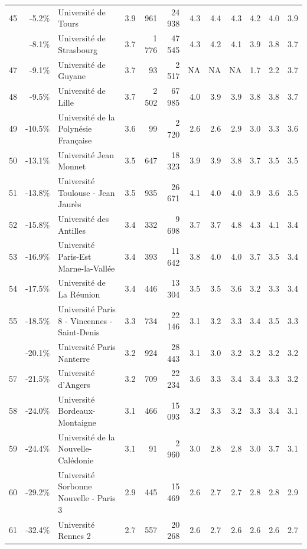 \documentclass[12pt,french,landscape]{article}
\begin{document}
\begin{longtable}{rrlrrrrrrlrr}
\rowcolor{gray!6}  45 & -5.2\% & Université de Tours & 3.9 & 961 & 24 938 & 4.3 & 4.4 & 4.3 & 4.2 & 4.0 & 3.9\\
\addlinespace
46 & -8.1\% & Université de Strasbourg & 3.7 & 1 776 & 47 545 & 4.3 & 4.2 & 4.1 & 3.9 & 3.8 & 3.7\\
\rowcolor{gray!6}  47 & -9.1\% & Université de Guyane & 3.7 & 93 & 2 517 & NA & NA & NA & 1.7 & 2.2 & 3.7\\
48 & -9.5\% & Université de Lille & 3.7 & 2 502 & 67 985 & 4.0 & 3.9 & 3.9 & 3.8 & 3.8 & 3.7\\
\rowcolor{gray!6}  49 & -10.5\% & Université de la Polynésie Française & 3.6 & 99 & 2 720 & 2.6 & 2.6 & 2.9 & 3.0 & 3.3 & 3.6\\
50 & -13.1\% & Université Jean Monnet & 3.5 & 647 & 18 323 & 3.9 & 3.9 & 3.8 & 3.7 & 3.5 & 3.5\\
\addlinespace
\rowcolor{gray!6}  51 & -13.8\% & Université Toulouse - Jean Jaurès & 3.5 & 935 & 26 671 & 4.1 & 4.0 & 4.0 & 3.9 & 3.6 & 3.5\\
52 & -15.8\% & Université des Antilles & 3.4 & 332 & 9 698 & 3.7 & 3.7 & 4.8 & 4.3 & 4.1 & 3.4\\
\rowcolor{gray!6}  53 & -16.9\% & Université Paris-Est Marne-la-Vallée & 3.4 & 393 & 11 642 & 3.8 & 4.0 & 4.0 & 3.7 & 3.5 & 3.4\\
54 & -17.5\% & Université de La Réunion & 3.4 & 446 & 13 304 & 3.5 & 3.5 & 3.6 & 3.2 & 3.3 & 3.4\\
\rowcolor{gray!6}  55 & -18.5\% & Université Paris 8 - Vincennes - Saint-Denis & 3.3 & 734 & 22 146 & 3.1 & 3.2 & 3.3 & 3.4 & 3.5 & 3.3\\
\addlinespace
56 & -20.1\% & Université Paris Nanterre & 3.2 & 924 & 28 443 & 3.1 & 3.0 & 3.2 & 3.2 & 3.2 & 3.2\\
\rowcolor{gray!6}  57 & -21.5\% & Université d'Angers & 3.2 & 709 & 22 234 & 3.6 & 3.3 & 3.4 & 3.4 & 3.3 & 3.2\\
58 & -24.0\% & Université Bordeaux-Montaigne & 3.1 & 466 & 15 093 & 3.2 & 3.3 & 3.2 & 3.3 & 3.4 & 3.1\\
\rowcolor{gray!6}  59 & -24.4\% & Université de la Nouvelle-Calédonie & 3.1 & 91 & 2 960 & 3.0 & 2.8 & 2.8 & 3.0 & 3.7 & 3.1\\
60 & -29.2\% & Université Sorbonne Nouvelle - Paris 3 & 2.9 & 445 & 15 469 & 2.6 & 2.7 & 2.7 & 2.8 & 2.8 & 2.9\\
\addlinespace
\rowcolor{gray!6}  61 & -32.4\% & Université Rennes 2 & 2.7 & 557 & 20 268 & 2.6 & 2.7 & 2.6 & 2.6 & 2.6 & 2.7\\

\end{longtable}
\end{document}
